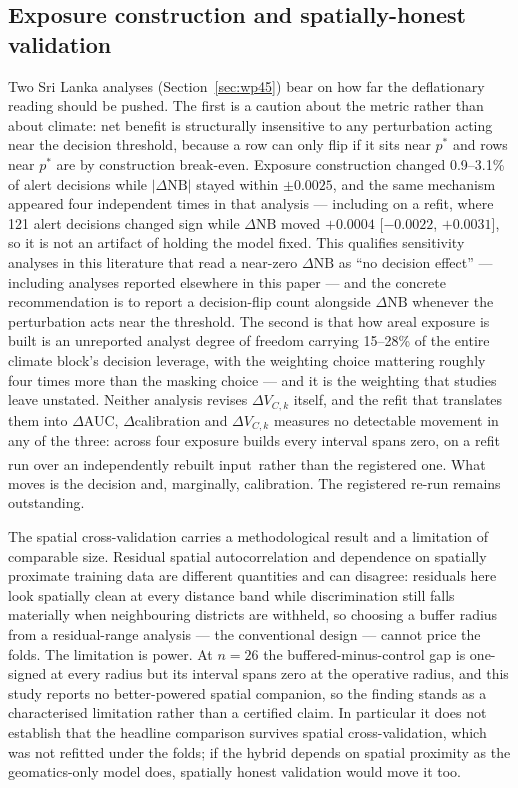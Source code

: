 \documentclass[11pt,a4paper]{article}
\providecommand{\REBUILD}{\textsuperscript{\ddag}}
\begin{document}
\subsection*{Exposure construction and spatially-honest validation}
Two Sri Lanka analyses (Section~\ref{sec:wp45}) bear on how far the deflationary reading should be pushed. The first is a caution about the metric rather than about climate: net benefit is structurally insensitive to any perturbation acting near the decision threshold, because a row can only flip if it sits near $p^*$ and rows near $p^*$ are by construction break-even. Exposure construction changed 0.9--3.1\% of alert decisions while $|\Delta\mathrm{NB}|$ stayed within $\pm0.0025$, and the same mechanism appeared four independent times in that analysis --- including on a refit, where 121 alert decisions changed sign while $\Delta\mathrm{NB}$ moved $+0.0004$ [$-0.0022$, $+0.0031$], so it is not an artifact of holding the model fixed. This qualifies sensitivity analyses in this literature that read a near-zero $\Delta\mathrm{NB}$ as ``no decision effect'' --- including analyses reported elsewhere in this paper --- and the concrete recommendation is to report a decision-flip count alongside $\Delta\mathrm{NB}$ whenever the perturbation acts near the threshold. The second is that how areal exposure is built is an unreported analyst degree of freedom carrying 15--28\% of the entire climate block's decision leverage, with the weighting choice mattering roughly four times more than the masking choice --- and it is the weighting that studies leave unstated. Neither analysis revises $\Delta V_{C,k}$ itself, and the refit that translates them into $\Delta$AUC, $\Delta$calibration and $\Delta V_{C,k}$ measures no detectable movement in any of the three: across four exposure builds every interval spans zero, on a refit run over an independently rebuilt input\,\REBUILD{} rather than the registered one. What moves is the decision and, marginally, calibration. The registered re-run remains outstanding.

The spatial cross-validation carries a methodological result and a limitation of comparable size. Residual spatial autocorrelation and dependence on spatially proximate training data are different quantities and can disagree: residuals here look spatially clean at every distance band while discrimination still falls materially when neighbouring districts are withheld, so choosing a buffer radius from a residual-range analysis --- the conventional design --- cannot price the folds. The limitation is power. At $n=26$ the buffered-minus-control gap is one-signed at every radius but its interval spans zero at the operative radius, and this study reports no better-powered spatial companion, so the finding stands as a characterised limitation rather than a certified claim. In particular it does not establish that the headline comparison survives spatial cross-validation, which was not refitted under the folds; if the hybrid depends on spatial proximity as the geomatics-only model does, spatially honest validation would move it too.
\end{document}
